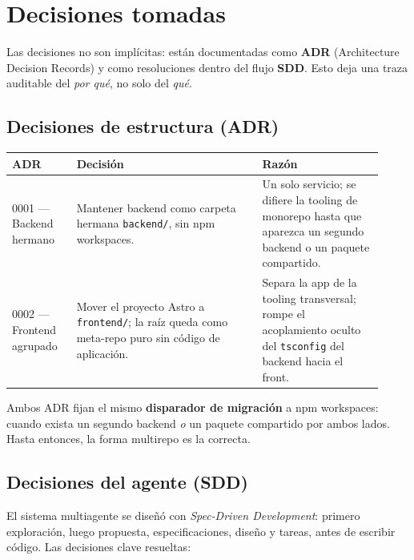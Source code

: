 \documentclass[11pt,a4paper]{article}
\newcommand{\code}[1]{\texttt{\small #1}}
\begin{document}
\section{Decisiones tomadas}

Las decisiones no son implícitas: están documentadas como \textbf{ADR}
(Architecture Decision Records) y como resoluciones dentro del flujo
\textbf{SDD}. Esto deja una traza auditable del \emph{por qué}, no solo del
\emph{qué}.

\subsection{Decisiones de estructura (ADR)}

\begin{center}
\renewcommand{\arraystretch}{1.3}
\begin{tabular}{@{}p{0.16\linewidth}p{0.46\linewidth}p{0.30\linewidth}@{}}
\toprule
\textbf{ADR} & \textbf{Decisión} & \textbf{Razón} \\
\midrule
0001 — Backend hermano &
Mantener backend como carpeta hermana \code{backend/}, sin npm workspaces. &
Un solo servicio; se difiere la tooling de monorepo hasta que aparezca un
segundo backend o un paquete compartido. \\
0002 — Frontend agrupado &
Mover el proyecto Astro a \code{frontend/}; la raíz queda como meta-repo puro
sin código de aplicación. &
Separa la app de la tooling transversal; rompe el acoplamiento oculto del
\code{tsconfig} del backend hacia el front. \\
\bottomrule
\end{tabular}
\end{center}

Ambos ADR fijan el mismo \textbf{disparador de migración} a npm workspaces:
cuando exista un segundo backend \emph{o} un paquete compartido por ambos
lados. Hasta entonces, la forma multirepo es la correcta.

\subsection{Decisiones del agente (SDD)}

El sistema multiagente se diseñó con \emph{Spec-Driven Development}: primero
exploración, luego propuesta, especificaciones, diseño y tareas, antes de
escribir código. Las decisiones clave resueltas:
\end{document}
